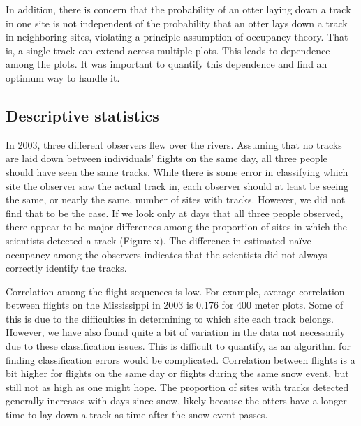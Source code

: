 \documentclass[12pt]{article}
\begin{document}
In addition, there is concern that the probability of an otter laying down a 
track in one site is not independent of the probability that an otter lays down 
a track in neighboring sites, violating a principle assumption of occupancy 
theory. That is, a single track can extend across multiple plots. This leads to 
dependence among the plots. It was important to quantify this dependence and 
find an optimum way to handle it.

\subsection{Descriptive statistics}
In 2003, three different observers flew over the rivers. Assuming that no tracks 
are laid down between individuals' flights on the same day, all three people 
should have seen the same tracks. While there is some error in classifying which 
site the observer saw the actual track in, each observer should at least be 
seeing the same, or nearly the same, number of sites with tracks. However, we 
did not find that to be the case. If we look only at days that all three people 
observed, there appear to be major differences among the proportion of sites in 
which the scientists detected a track (Figure x). The difference in estimated 
na\"ive occupancy among the observers indicates that the scientists did not 
always correctly identify the tracks. 

Correlation among the flight sequences is low. For example, average correlation 
between flights on the Mississippi in 2003 is 0.176 for 400 meter plots. Some of 
this is due to the difficulties in determining to which site each track belongs. 
However, we have also found quite a bit of variation in the data not necessarily 
due to these classification issues. This is difficult to quantify, as an 
algorithm for finding classification errors would be complicated. Correlation 
between flights is a bit higher for flights on the same day or flights during 
the same snow event, but still not as high as one might hope. The proportion of 
sites with tracks detected generally increases with days since snow, likely 
because the otters have a longer time to lay down a track as time after the snow 
event passes.
\end{document}
